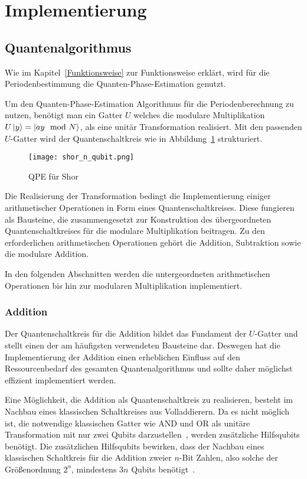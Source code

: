 \section{Implementierung}

\subsection{Quantenalgorithmus}
Wie im Kapitel~\ref*{Funktionsweise} zur Funktionsweise erklärt,
wird für die Periodenbestimmung die Quanten-Phase-Estimation genutzt.

Um den Quanten-Phase-Estimation Algorithmus für die Periodenberechnung zu nutzen,
benötigt man ein Gatter \(U\) welches die modulare Multiplikation \(U\ket{y} = \ket{ay \mod N}\), 
als eine unitär Transformation realisiert.
Mit den passenden \(U\)-Gatter wird der Quantenschaltkreis wie in Abbildung~\ref{fig:shor_n_qubit} strukturiert.
\begin{figure}
    \caption{QPE für Shor~\cite{anonymousket}}
    \label{fig:shor_n_qubit}
    \texttt{[image: shor\_n\_qubit.png]}
    \centering
    \end{figure}

Die Realisierung der Transformation bedingt die Implementierung einiger arithmetischer Operationen in Form eines Quantenschaltkreises. 
Diese fungieren als Bausteine, die zusammengesetzt zur Konstruktion des übergeordneten Quantenschaltkreises für die modulare Multiplikation beitragen. 
Zu den erforderlichen arithmetischen Operationen gehört die Addition, Subtraktion sowie die modulare Addition.

In den folgenden Abschnitten werden die untergeordneten arithmetischen Operationen bis hin zur modularen Multiplikation implementiert.

\subsubsection{Addition}
Der Quantenschaltkreis für die Addition bildet das Fundament der \(U\)-Gatter und 
stellt einen der am häufigsten verwendeten Bausteine dar. 
Deswegen hat die Implementierung der Addition einen erheblichen Einfluss auf den Ressourcenbedarf des gesamten Quantenalgorithmus
und sollte daher möglichst effizient implementiert werden.

Eine Möglichkeit, die Addition als Quantenschaltkreis zu realisieren, 
besteht im Nachbau eines klassischen Schaltkreises aus Volladdierern. 
Da es nicht möglich ist, 
die notwendige klassischen Gatter wie AND und OR als unitäre Transformation mit nur zwei Qubits darzustellen~\cite{Hoever2023QC},
werden zusätzliche Hilfsqubits benötigt.
Die zusätzlichen Hilfsqubits bewirken, dass der Nachbau eines klassischen Schaltkreis für die Addition zweier \(n\)-Bit Zahlen, 
also solche der Größenordnung \(2^n\), mindestens \(3n\) Qubits benötigt~\cite{zalka1998fast}.

